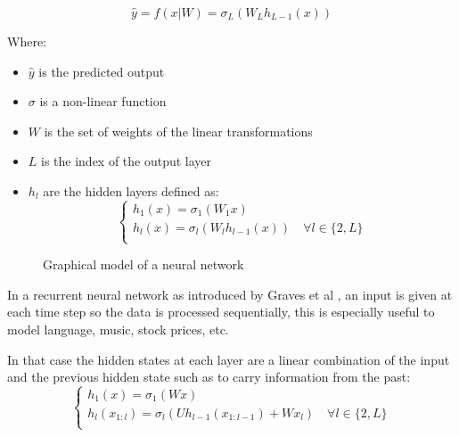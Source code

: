 \documentclass[10pt,oneside,openright]{report}
\begin{document}
$$ \hat{y} = f(x | W) = \sigma_L (W_L h_{L-1}(x)) $$

Where:
\begin{itemize}
\item $\hat{y}$ is the predicted output
\item $\sigma$ is a non-linear function
\item $W$ is the set of weights of the linear transformations
\item $L$ is the index of the output layer
\item $h_l$ are the hidden layers defined as:
  \begin{equation}
    \begin{cases}
          h_1(x) = \sigma_1(W_1 x)\\
          h_l(x) = \sigma_l (W_l h_{l-1}(x)) \quad \forall l \in \{2, L\}\\
    \end{cases}
  \end{equation}
\end{itemize}

\begin{figure}[H]
\centering
{}
\caption{Graphical model of a neural network}
\end{figure}

In a recurrent neural network as introduced by Graves et al \cite{graves}, an input is given at each time step so the data is processed sequentially, this is especially useful to model language, music, stock prices, etc.

In that case the hidden states at each layer are a linear combination of the input and the previous hidden state such as to carry information from the past:
  \begin{equation}
    \begin{cases}
          h_1(x) = \sigma_1(W x) \\
          h_l(x_{1:l}) = \sigma_l (U h_{l-1}(x_{1:l-1}) + W x_l) \quad \forall l \in \{2, L\}\\
    \end{cases}
  \end{equation}
\end{document}
